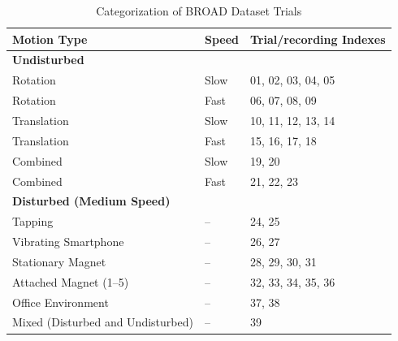 \documentclass{iutbscthesis}
\begin{document}
\begin{table}[htbp]
\centering
\caption{Categorization of BROAD Dataset Trials}
\label{tab:broad_trial_categories}
    \begin{tabular}{|p{}|p{}|l|}
        \hline
        \textbf{Motion Type} & \textbf{Speed} & \textbf{Trial/recording Indexes}  \\
        \hline
        \multicolumn{3}{|l|}{\textbf{Undisturbed}} \\
        \hline
        Rotation & Slow & 01, 02, 03, 04, 05 \\
        Rotation & Fast & 06, 07, 08, 09 \\
        Translation & Slow & 10, 11, 12, 13, 14 \\
        Translation & Fast & 15, 16, 17, 18 \\
        Combined & Slow & 19, 20  \\
        Combined & Fast & 21, 22, 23 \\
        \hline
        \multicolumn{3}{|l|}{\textbf{Disturbed (Medium Speed)}} \\
        \hline
        Tapping & -- & 24, 25  \\
        Vibrating Smartphone & -- & 26, 27  \\
        Stationary Magnet & -- & 28, 29, 30, 31 \\
        Attached Magnet (1–5) & -- & 32, 33, 34, 35, 36  \\
        Office Environment & -- & 37, 38  \\
        Mixed (Disturbed and Undisturbed) & -- & 39 \\
        \hline

    \end{tabular}
\end{table}
\end{document}

